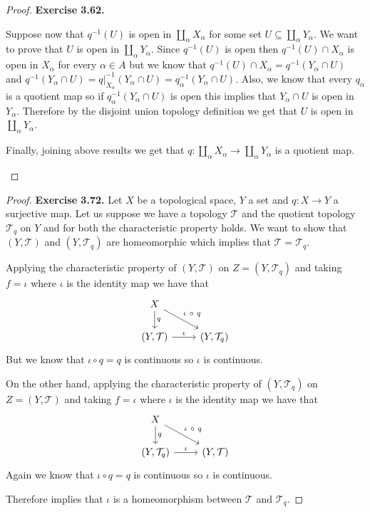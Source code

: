 \documentclass[11pt]{article}
\newcommand{\Topo}{\mathcal{T}}
\theoremstyle{definition}
\begin{document}
\begin{proof}{\textbf{Exercise 3.62.}}
\begin{itemize}
    Suppose now that $q^{-1}(U)$ is open in $\coprod_\alpha X_\alpha$ for some
    set $U \subseteq \coprod_\alpha Y_\alpha$. We want to prove that $U$
    is open in $\coprod_\alpha Y_\alpha$.
    Since $q^{-1}(U)$ is open then $q^{-1}(U) \cap X_\alpha$ is open in
    $X_\alpha$ for every  $\alpha \in A$ but we know that
    $q^{-1}(U) \cap X_\alpha = q^{-1}(Y_\alpha \cap U)$ and 
    $q^{-1}(Y_\alpha \cap U) =
    q|_{X_\alpha}^{-1}(Y_\alpha \cap U) = q_\alpha^{-1}(Y_\alpha \cap U)$.
    Also, we know that every $q_\alpha$ is a quotient map so if
    $q_\alpha^{-1}(Y_\alpha \cap U)$ is open this implies that $Y_\alpha \cap U$
    is open in $Y_\alpha$.
    Therefore by the disjoint union topology definition we get that
    $U$ is open in $\coprod_\alpha Y_\alpha$.

    Finally, joining above results we get that
    $q:\coprod_\alpha X_\alpha \to \coprod_\alpha Y_\alpha$ is a quotient map.

\end{itemize}
\end{proof}
\cleardoublepage
\begin{proof}{\textbf{Exercise 3.72.}}
    Let $X$ be a topological space, $Y$ a set and $q:X \to Y$ a surjective
    map. Let us suppose we have a topology $\Topo$ and the quotient topology
    $\Topo_q$ on $Y$ and for both the characteristic property holds.
    We want to show that $(Y,\Topo)$ and $(Y,\Topo_q)$ are homeomorphic which
    implies that $\Topo = \Topo_q$.

    Applying the characteristic property of $(Y, \Topo)$ on $Z = (Y, \Topo_q)$
    and taking $f = \iota$ where $\iota$ is the identity map we have that
    \[
        \begin{tikzcd} 
            X \arrow[d,"q"]\arrow[rd,"\iota~\circ~q"] &\\
            (Y, \Topo)\arrow[r,"\iota"] & (Y, \Topo_q)
        \end{tikzcd}
    \]
    But we know that $\iota \circ q = q$ is continuous so $\iota$ is continuous.

    On the other hand, applying the characteristic property of $(Y, \Topo_q)$
    on $Z = (Y, \Topo)$ and taking $f = \iota$ where $\iota$ is the identity
    map we have that
    \[
        \begin{tikzcd} 
            X \arrow[d,"q"]\arrow[rd,"\iota~\circ~q"] &\\
            (Y, \Topo_q)\arrow[r,"\iota"] & (Y, \Topo)
        \end{tikzcd}
    \]
    Again we know that $\iota \circ q = q$ is continuous so $\iota$ is
    continuous.

    Therefore implies that $\iota$ is a homeomorphism between $\Topo$ and
    $\Topo_q$.
\end{proof}
\end{document}
